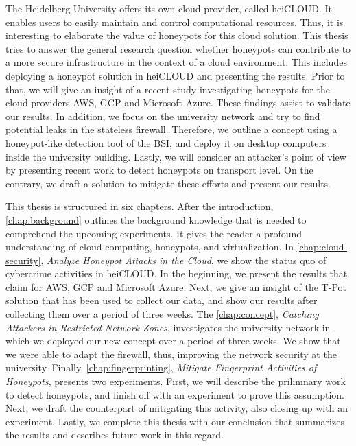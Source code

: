 The Heidelberg University offers its own cloud provider, called heiCLOUD.
It enables users to easily maintain and control computational resources. 
Thus, it is interesting to elaborate the value of honeypots for this cloud solution.
This thesis tries to answer the general research question whether honeypots can contribute to a more secure infrastructure in the context of a cloud environment.
This includes deploying a honeypot solution in heiCLOUD and presenting the results.
Prior to that, we will give an insight of a recent study investigating honeypots for the cloud providers AWS, GCP and Microsoft Azure.
These findings assist to validate our results.
In addition, we focus on the university network and try to find potential leaks in the stateless firewall.
Therefore, we outline a concept using a honeypot-like detection tool of the BSI, and deploy it on desktop computers inside the university building.
Lastly, we will consider an attacker's point of view by presenting recent work to detect honeypots on transport level.
On the contrary, we draft a solution to mitigate these efforts and present our results.

This thesis is structured in six chapters.
After the introduction, \autoref{chap:background} outlines the background knowledge that is needed to comprehend the upcoming experiments.
It gives the reader a profound understanding of cloud computing, honeypots, and virtualization.
In \autoref{chap:cloud-security}, \textit{Analyze Honeypot Attacks in the Cloud}, we show the status quo of cybercrime activities in heiCLOUD.
In the beginning, we present the results that \citet{Kelly2021} claim for AWS, GCP and Microsoft Azure.
Next, we give an insight of the T-Pot solution that has been used to collect our data, and show our results after collecting them over a period of three weeks.
The \autoref{chap:concept}, \textit{Catching Attackers in Restricted Network Zones}, investigates the university network in which we deployed our new concept over a period of three weeks.
We show that we were able to adapt the firewall, thus, improving the network security at the university.
Finally, \autoref{chap:fingerprinting}, \textit{Mitigate Fingerprint Activities of Honeypots}, presents two experiments.
First, we will describe the prilimnary work to detect honeypots, and finish off with an experiment to prove this assumption.
Next, we draft the counterpart of mitigating this activity, also closing up with an experiment.
Lastly, we complete this thesis with our conclusion that summarizes the results and describes future work in this regard.
